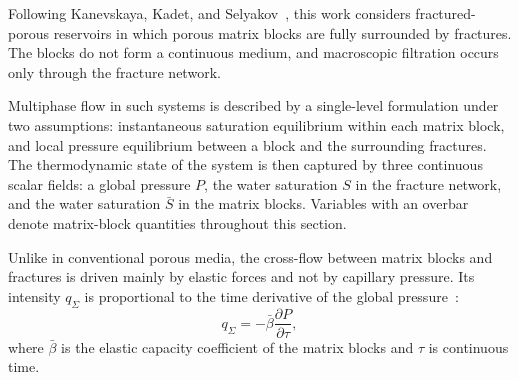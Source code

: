 Following Kanevskaya, Kadet, and Selyakov~\cite{textbook_fpor}, this work considers fractured-porous reservoirs in which porous matrix blocks are fully surrounded by fractures. The blocks do not form a continuous medium, and macroscopic filtration occurs only through the fracture network.

Multiphase flow in such systems is described by a single-level formulation under two assumptions: instantaneous saturation equilibrium within each matrix block, and local pressure equilibrium between a block and the surrounding fractures. The thermodynamic state of the system is then captured by three continuous scalar fields: a global pressure $P$, the water saturation $S$ in the fracture network, and the water saturation $\bar{S}$ in the matrix blocks. Variables with an overbar denote matrix-block quantities throughout this section.

Unlike in conventional porous media, the cross-flow between matrix blocks and fractures is driven mainly by elastic forces and not by capillary pressure. Its intensity $q_\Sigma$ is proportional to the time derivative of the global pressure~\cite{textbook_fpor}:
\begin{equation}
    q_\Sigma = -\bar{\beta} \frac{\partial P}{\partial \tau},
    \label{eq:mass_transfer}
\end{equation}
where $\bar{\beta}$ is the elastic capacity coefficient of the matrix blocks and $\tau$ is continuous time.

